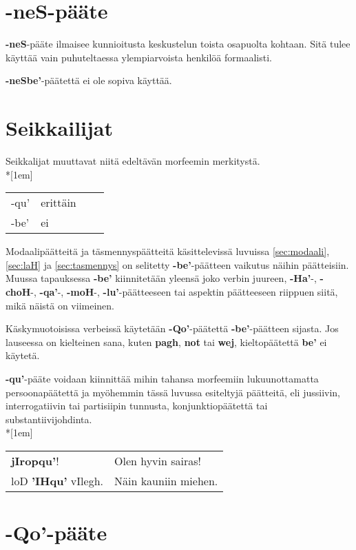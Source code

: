 \documentclass{book}
\begin{document}
\section{-neS-pääte}

\textbf{-neS}-pääte ilmaisee kunnioitusta keskustelun toista osapuolta kohtaan.
Sitä tulee käyttää vain puhuteltaessa ylempiarvoista henkilöä formaalisti.

\textbf{-neSbe'}-päätettä ei ole sopiva käyttää.

\section{Seikkailijat}

Seikkalijat muuttavat niitä edeltävän morfeemin merkitystä.
\\*[1em]
\begin{tabular}{Bl Il}
    -qu' & erittäin \\
    -be' & ei \\
\end{tabular}

Modaalipäätteitä ja täsmennyspäätteitä käsittelevissä luvuissa \ref{sec:modaali}, \ref{sec:laH} ja \ref{sec:tasmennys} on selitetty \textbf{-be'}-päätteen vaikutus näihin päätteisiin.
Muussa tapauksessa \textbf{-be'} kiinnitetään yleensä joko verbin juureen, \textbf{-Ha'}-, \textbf{-choH}-, \textbf{-qa'}-, \textbf{-moH}-, \textbf{-lu'}-päätteeseen tai aspektin päätteeseen riippuen siitä, mikä näistä on viimeinen.

Käskymuotoisissa verbeissä käytetään \textbf{-Qo'}-päätettä \textbf{-be'}-päätteen sijasta.
Jos lauseessa on kielteinen sana, kuten \textbf{pagh}, \textbf{not} tai \textbf{wej}, kieltopäätettä \textbf{be'} ei käytetä.

\textbf{-qu'}-pääte voidaan kiinnittää mihin tahansa morfeemiin lukuunottamatta persoonapäätettä ja myöhemmin tässä luvussa esiteltyjä päätteitä, eli jussiivin, interrogatiivin tai partisiipin tunnusta, konjunktiopäätettä tai substantiivijohdinta.\\*[1em]
\begin{tabular}{l l}
    \textbf{jIropqu'}! & Olen hyvin sairas! \\
    loD \textbf{'IHqu'} vIlegh. & Näin kauniin miehen. \\
\end{tabular}

\section{-Qo'-pääte}
\end{document}
